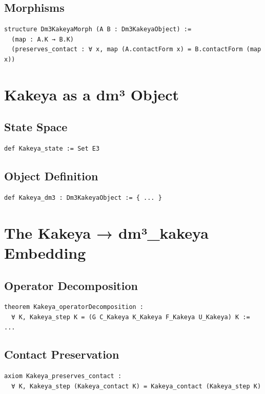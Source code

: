 \documentclass[11pt,a4paper]{article}
\begin{document}
\subsection{Morphisms}
\begin{lstlisting}
structure Dm3KakeyaMorph (A B : Dm3KakeyaObject) :=
  (map : A.K → B.K)
  (preserves_contact : ∀ x, map (A.contactForm x) = B.contactForm (map x))
\end{lstlisting}

\section{Kakeya as a dm³ Object}

\subsection{State Space}
\begin{lstlisting}
def Kakeya_state := Set E3
\end{lstlisting}

\subsection{Object Definition}
\begin{lstlisting}
def Kakeya_dm3 : Dm3KakeyaObject := { ... }
\end{lstlisting}

\section{The Kakeya → dm³\_kakeya Embedding}

\subsection{Operator Decomposition}
\begin{lstlisting}
theorem Kakeya_operatorDecomposition :
  ∀ K, Kakeya_step K = (G C_Kakeya K_Kakeya F_Kakeya U_Kakeya) K := ...
\end{lstlisting}

\subsection{Contact Preservation}
\begin{lstlisting}
axiom Kakeya_preserves_contact :
  ∀ K, Kakeya_step (Kakeya_contact K) = Kakeya_contact (Kakeya_step K)
\end{lstlisting}
\end{document}
